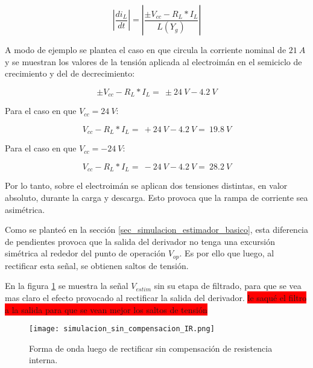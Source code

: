 \begin{equation} \label{eq_Vbus-didt-RL}
	\left|\frac{di_L}{dt}\right|=\left|\frac{\pm V_{cc}-R_L*I_L}{L(Y_g)}\right|
\end{equation}

A modo de ejemplo se plantea el caso en que circula la corriente nominal de $21\:A$ y se muestran los valores de la tensión aplicada al electroimán en el semiciclo de crecimiento y del de decrecimiento:

\begin{equation} \label{eq_Vbus-didt-RL-2}
	\pm V_{cc}-R_L*I_L=\ \pm 24\:V-4.2\:V
\end{equation}

Para el caso en que $V_{cc}=24\:V$:

\begin{equation} \label{eq_Vbus-didt-RL-3}
	V_{cc}-R_L*I_L=\ +24\:V-4.2\:V=\ 19.8\:V
\end{equation}

Para el caso en que $V_{cc}=-24\:V$:

\begin{equation} \label{eq_Vbus-didt-RL-4}
	V_{cc}-R_L*I_L=\ -24\:V-4.2\:V=\ 28.2\:V
\end{equation}

Por lo tanto, sobre el electroimán se aplican dos tensiones distintas, en valor absoluto, durante la carga y descarga. Esto provoca que la rampa de corriente sea asimétrica.

Como se planteó en la sección \ref{sec_simulacion_estimador_basico}, esta diferencia de pendientes provoca que la salida del derivador no tenga una excursión simétrica al rededor del punto de operación $V_{op}$. Es por ello que luego, al rectificar esta señal, se obtienen saltos de tensión.

En la figura \ref{fig:img_simulacion_sin_compensacion_IR} se muestra la señal $V_{estim}$ sin su etapa de filtrado, para que se vea mas claro el efecto provocado al rectificar la salida del derivador. 
\colorbox{red}{le saqué el filtro a la salida para que se vean mejor los saltos de tensión}


\begin{figure}[H]
	\centering
	\texttt{[image: simulacion\_sin\_compensacion\_IR.png]}
	\caption{Forma de onda luego de rectificar sin compensación de resistencia interna.}
	\label{fig:img_simulacion_sin_compensacion_IR}
\end{figure}

